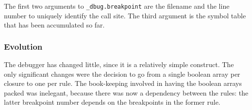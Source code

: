 The first two arguments to \verb|_dbug.breakpoint| are the filename and the line number to uniquely identify the call site.
The third argument is the symbol table that has been accumulated so far.

\subsubsection{Evolution}
The debugger has changed little, since it is a relatively simple construct.
The only significant changes were the decision to go from a single boolean array per closure to one per rule.
The book-keeping involved in having the boolean arrays packed was inelegant, because there was now a dependency between the rules: the latter breakpoint number depends on the breakpoints in the former rule.

